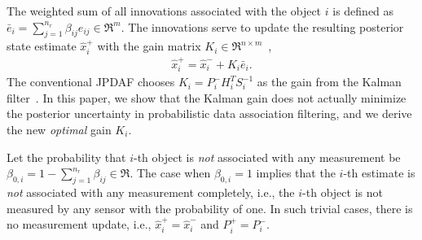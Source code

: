 The weighted sum of all innovations associated with the object $i$ is defined as ${\bar{e}}_{i}={\sum\limits_{j=1}^{n_r} \beta_{ij}e_{ij}}\in\Re^m$.
The innovations serve to update the resulting posterior state estimate $\hat x^+_{i}$ with the gain matrix $K_i\in\Re^{n\times m}$~\cite{TrackDataAssoc},
\begin{align}
\hat x^+_{i}= \hat x^-_{i}+K_{i}{\bar{e}}_{i}.\label{eqn:KalEst}
\end{align}
The conventional JPDAF chooses $K_i=P^-_iH_i^TS_i^{-1}$ as the gain from the Kalman filter~\cite{TrackDataAssoc}.
In this paper, we show that the Kalman gain does not actually minimize the posterior uncertainty in probabilistic data association filtering, and we derive the new \textit{optimal} gain $K_i$.

Let the probability that $i$-th object is \textit{not} associated with any measurement be $\beta_{0,i}=1-{\sum_{j=1}^{n_r} \beta_{ij}}\in\Re$. The case when $\beta_{0,i}=1$ implies that the $i$-th estimate is \emph{not} associated with any measurement completely, i.e., the $i$-th object is not measured by any sensor with the probability of one. In such trivial cases, there is no measurement update, i.e., $\hat x^+_i=\hat x^-_i$ and $P_i^+=P_i^-$. 

